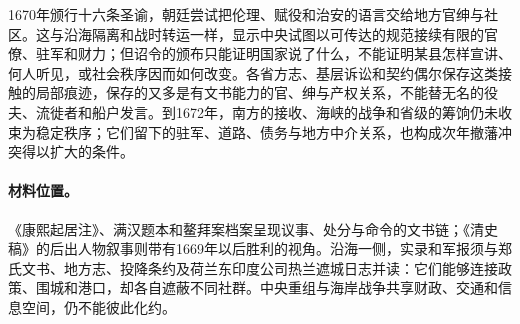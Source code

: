 1670年颁行十六条圣谕，朝廷尝试把伦理、赋役和治安的语言交给地方官绅与社区。这与沿海隔离和战时转运一样，显示中央试图以可传达的规范接续有限的官僚、驻军和财力；但诏令的颁布只能证明国家说了什么，不能证明某县怎样宣讲、何人听见，或社会秩序因而如何改变。各省方志、基层诉讼和契约偶尔保存这类接触的局部痕迹，保存的又多是有文书能力的官、绅与产权关系，不能替无名的役夫、流徙者和船户发言。到1672年，南方的接收、海峡的战争和省级的筹饷仍未收束为稳定秩序；它们留下的驻军、道路、债务与地方中介关系，也构成次年撤藩冲突得以扩大的条件。

\paragraph{材料位置。} 《康熙起居注》、满汉题本和鳌拜案档案呈现议事、处分与命令的文书链；《清史稿》的后出人物叙事则带有1669年以后胜利的视角。沿海一侧，实录和军报须与郑氏文书、地方志、投降条约及荷兰东印度公司热兰遮城日志并读：它们能够连接政策、围城和港口，却各自遮蔽不同社群。中央重组与海岸战争共享财政、交通和信息空间，仍不能彼此化约。




